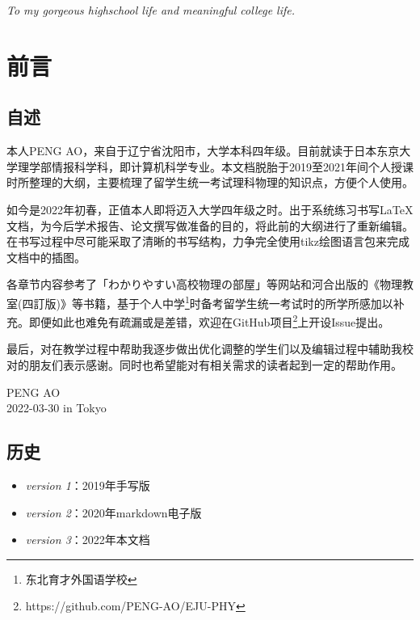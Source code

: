 
\clearpage
\begin{center}
    \null

    \vspace{0.382\textheight}
    \textit{\large
        To my gorgeous highschool life
        and meaningful college life.
    }
\end{center}


\clearpage
\chapter{前言}

\section*{自述}
本人PENG AO，来自于辽宁省沈阳市，大学本科四年级。目前就读于日本东京大学理学部情报科学科，即计算机科学专业。本文档脱胎于2019至2021年间个人授课时所整理的大纲，主要梳理了留学生统一考试理科物理的知识点，方便个人使用。

如今是2022年初春，正值本人即将迈入大学四年级之时。出于系统练习书写\LaTeX 文档，为今后学术报告、论文撰写做准备的目的，将此前的大纲进行了重新编辑。在书写过程中尽可能采取了清晰的书写结构，力争完全使用tikz绘图语言包来完成文档中的插图。

各章节内容参考了「わかりやすい高校物理の部屋」等网站和河合出版的《物理教室(四訂版)》等书籍，基于个人中学\footnote{东北育才外国语学校}时备考留学生统一考试时的所学所感加以补充。即便如此也难免有疏漏或是差错，欢迎在GitHub项目\footnote{https://github.com/PENG-AO/EJU-PHY}上开设Issue提出。

最后，对在教学过程中帮助我逐步做出优化调整的学生们以及编辑过程中辅助我校对的朋友们表示感谢。同时也希望能对有相关需求的读者起到一定的帮助作用。

\vfill
\begin{flushright}
    PENG AO\\
    2022-03-30 in Tokyo
\end{flushright}

\section*{历史}
\begin{itemize}
    \item \textit{version 1}：2019年手写版
    \item \textit{version 2}：2020年markdown电子版
    \item \textit{version 3}：2022年本文档
\end{itemize}

